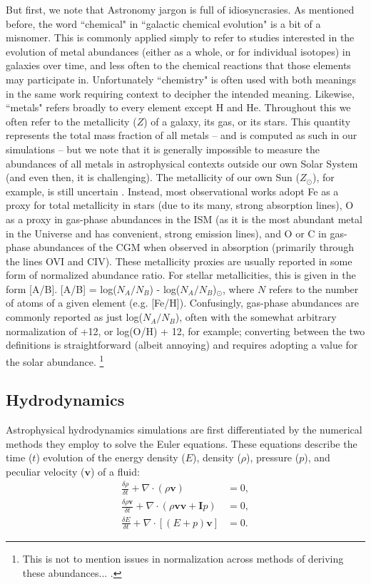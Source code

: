 But first, we note that Astronomy jargon is full of idiosyncrasies. As mentioned before, the word ``chemical" in ``galactic chemical evolution" is a bit of a misnomer. This is commonly applied simply to refer to studies interested in the evolution of metal abundances (either as a whole, or for individual isotopes) in galaxies over time, and less often to the chemical reactions that those elements may participate in. Unfortunately ``chemistry" is often used with both meanings in the same work requiring context to decipher the intended meaning. Likewise, ``metals" refers broadly to every element except H and He. Throughout this \dissertation we often refer to the metallicity ($Z$) of a galaxy, its gas, or its stars. This quantity represents the total mass fraction of all metals -- and is computed as such in our simulations -- but we note that it is generally impossible to measure the abundances of all metals in astrophysical contexts outside our own Solar System (and even then, it is challenging). The metallicity of our own Sun ($Z_{\odot}$), for example, is still uncertain \citep{Asplund2009}. Instead, most observational works adopt Fe as a proxy for total metallicity in stars (due to its many, strong absorption lines), O as a proxy in gas-phase abundances in the ISM (as it is the most abundant metal in the Universe and has convenient, strong emission lines), and O or C in gas-phase abundances of the CGM when observed in absorption (primarily through the lines OVI and CIV). These metallicity proxies are usually reported in some form of normalized abundance ratio. For stellar metallicities, this is given in the form [A/B]. [A/B] = log($N_A / N_B$) - log($N_A / N_B$)$_{\odot}$, where $N$ refers to the number of atoms of a given element (e.g. [Fe/H]). Confusingly, gas-phase abundances are commonly reported as just log($N_A / N_B$), often with the somewhat arbitrary normalization of +12, or log(O/H) + 12, for example; converting between the two definitions is straightforward (albeit annoying) and requires adopting a value for the solar abundance. \footnote{This is not to mention issues in normalization across methods of deriving these abundances... \citep[e.g.][]{KewleyEllison2008}.}

\subsection{Hydrodynamics}
\label{intro:sec:hydrodynamics}

Astrophysical hydrodynamics simulations are first differentiated by the numerical methods they employ to solve the Euler equations. These equations describe the time ($t$) evolution of the energy density ($E$), density ($\rho$), pressure ($p$), and peculiar velocity ($\bm{v}$) of a fluid:
\begin{align}
  \frac{\delta \rho}{\delta t} + \nabla \cdot \left(\rho \bm{v}\right)  &= 0,\\
  \frac{\delta \rho \bm{v}}{\delta t} + \nabla \cdot \left(\rho \bm{v}\bm{v} + \bm{I}p \right) &= 0,\\
  \frac{\delta E}{\delta t} + \nabla \cdot \left[\left(E +p\right)\bm{v}\right] &= 0.
\end{align}

